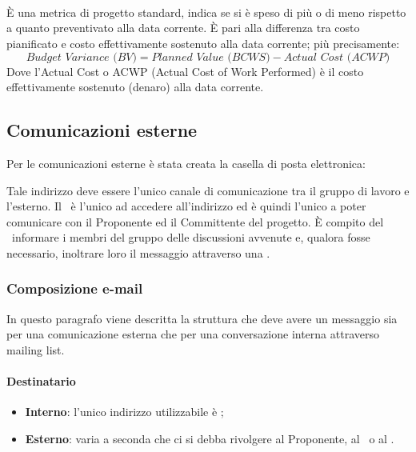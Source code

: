 \documentclass[../NormeDiProgetto.tex]{subfiles}
\begin{document}
				\paragraph{\\}
					È una metrica di progetto standard, indica se si è speso di più o
					di meno rispetto a quanto preventivato alla data corrente. È pari
					alla differenza tra costo pianificato e costo effettivamente
					sostenuto alla data corrente; più precisamente:
					\begin{equation*}
						\textit{Budget Variance (BV)} = \textit{Planned Value (BCWS)} - \textit{Actual Cost (ACWP)}
					\end{equation*}
					Dove l'Actual Cost o ACWP (Actual Cost of Work Performed) è il costo
					effettivamente sostenuto (denaro) alla data corrente.
			
			
		
			\subsection{Comunicazioni esterne}
				Per le comunicazioni esterne è stata creata la casella di posta
				elettronica:
				\begin{center}
					\mailkaleidoscode
				\end{center}
				Tale indirizzo deve essere l'unico canale di comunicazione tra il
				gruppo di lavoro e l'esterno.
				Il \responsabilediprogetto\ è l'unico ad accedere
				all'indirizzo ed è quindi l'unico a poter comunicare con il Proponente ed il
				Committente del progetto. È compito del \responsabilediprogetto\ informare
				i membri del gruppo delle discussioni avvenute e,
				qualora fosse necessario, inoltrare loro il messaggio attraverso
				una .
				
				\subsubsection{Composizione e-mail}
					In questo paragrafo viene descritta la struttura che deve avere
					un messaggio sia per una comunicazione esterna che per una
					conversazione interna attraverso mailing list.
					\paragraph{Destinatario}
						\begin{itemize}
							\item \textbf{Interno}: l'unico indirizzo utilizzabile è
							\mailkaleidoscode;
							\item \textbf{Esterno}: varia a seconda che ci si debba
							rivolgere  al Proponente, al \vardanega\ o al \cardin.
						\end{itemize}
\end{document}
